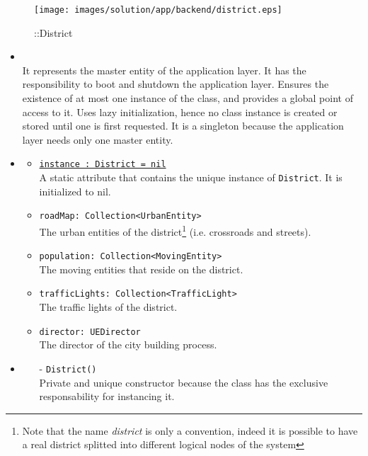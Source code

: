 \begin{figure}[h]
\centering
\texttt{[image: images/solution/app/backend/district.eps]}
\caption{\pReactive::District}
\label{fig:sd-app-district}
\end{figure}
\FloatBarrier
\begin{itemize}
  \item \textbf{\descr} \\
  It represents the master entity of the application layer. 
  It has the responsibility to boot and shutdown the application layer.
  Ensures the existence of at most one instance of the class, 
  and provides a global point of access to it.
  Uses lazy initialization, hence no class instance is created 
  or stored until one is first requested.
  It is a singleton because the application layer needs 
  only one master entity.
  \item \textbf{\attrs}
  \begin{itemize}
    \item \texttt{\underline{instance : District = nil}} \\
    A static attribute that contains the unique instance of \texttt{District}.
    It is initialized to nil.
    \item \texttt{roadMap: Collection<UrbanEntity>} \\
    The urban entities of the district\footnote{Note that the name 
    \textit{district} is only a convention, indeed it is possible to have a 
    real district splitted into different logical nodes of the system}
    (i.e. crossroads and streets). 
    \item \texttt{population: Collection<MovingEntity>} \\
    The moving entities that reside on the district.
    \item \texttt{trafficLights: Collection<TrafficLight>} \\
    The traffic lights of the district.
    \item \texttt{director: UEDirector} \\ 
    The director of the city building process.
  \end{itemize}
  \item \textbf{\ops}
  \begin{itemize}
    \item[-] \texttt{District()} \\
    Private and unique constructor because the class has the exclusive 
    responsability for instancing it.

\end{itemize}
\end{itemize}
